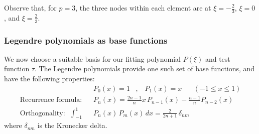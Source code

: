 \documentclass[10pt,a4paper]{article}
\begin{document}
Observe that, for $p=3$, the three nodes within each element are at $\xi =
-\frac{2}{3}$, $\xi = 0$, and $\xi = \frac{2}{3}$.

\subsubsection{Legendre polynomials as base functions}

We now choose a suitable basis for our fitting polynomial $P(\xi)$ and test
function $\tau$. The Legendre polynomials provide one such set of base
functions, and have the following properties:
\begin{align*}
& P_0(x) = 1 \;\;\; , \;\;\; P_1(x) = x \;\;\;\;\;\; (-1 \leq x \leq 1) \\
\mbox{Recurrence formula:} \;\;\; & P_n(x) = \frac{2n-1}{n} x \, P_{n-1}(x) -
\frac{n-1}{n} P_{n-2}(x) \\
\mbox{Orthogonality:} \;\;\; \int_{-1}^{1} & P_n(x) \, P_m(x) \, dx =
\frac{2}{2n+1} \, \delta_{nm}
\end{align*}
where $\delta_{nm}$ is the Kronecker delta.
\end{document}
